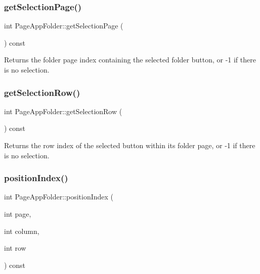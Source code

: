 \subsubsection{\texorpdfstring{get\+Selection\+Page()}{getSelectionPage()}}
{\footnotesize\ttfamily int Page\+App\+Folder\+::get\+Selection\+Page (\begin{DoxyParamCaption}{ }\end{DoxyParamCaption}) const}

\begin{DoxyReturn}{Returns}
the folder page index containing the selected folder button, or -\/1 if there is no selection. 
\end{DoxyReturn}
\mbox{\label{classPageAppFolder_a5d2e4c1c9a389824e03ea658adad2c57}} 
\subsubsection{\texorpdfstring{get\+Selection\+Row()}{getSelectionRow()}}
{\footnotesize\ttfamily int Page\+App\+Folder\+::get\+Selection\+Row (\begin{DoxyParamCaption}{ }\end{DoxyParamCaption}) const}

\begin{DoxyReturn}{Returns}
the row index of the selected button within its folder page, or -\/1 if there is no selection. 
\end{DoxyReturn}
\mbox{\label{classPageAppFolder_a90b3428fc2ebfb34759ca3d1e63ab530}} 
\subsubsection{\texorpdfstring{position\+Index()}{positionIndex()}}
{\footnotesize\ttfamily int Page\+App\+Folder\+::position\+Index (\begin{DoxyParamCaption}\item[{int}]{page,  }\item[{int}]{column,  }\item[{int}]{row }\end{DoxyParamCaption}) const}

